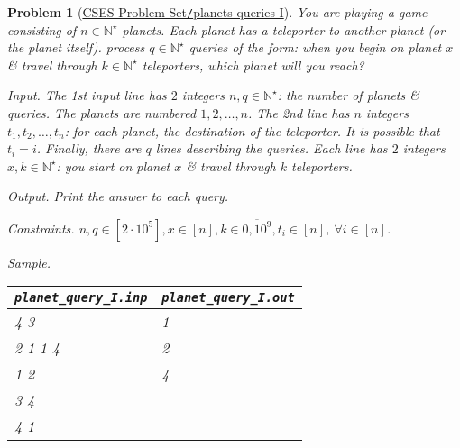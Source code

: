 \documentclass{article}
\newtheorem{problem}{Problem}
\begin{document}
\begin{problem}[\href{https://cses.fi/problemset/task/1750}{CSES Problem Set{\tt/}planets queries I}]
    You are playing a game consisting of $n\in\mathbb{N}^\star$ planets. Each planet has a teleporter to another planet (or the planet itself). process $q\in\mathbb{N}^\star$ queries of the form: when you begin on planet $x$ \& travel through $k\in\mathbb{N}^\star$ teleporters, which planet will you reach?
    \item {\sf Input.} The 1st input line has $2$ integers $n,q\in\mathbb{N}^\star$: the number of planets \& queries. The planets are numbered $1,2,\ldots,n$. The 2nd line has $n$ integers $t_1,t_2,\ldots,t_n$: for each planet,  the destination of the teleporter. It is possible that $t_i = i$. Finally, there are $q$ lines describing the queries. Each line has $2$ integers $x,k\in\mathbb{N}^\star$: you start on planet $x$ \& travel through $k$ teleporters.
    \item {\sf Output.} Print the answer to each query.
    \item {\sf Constraints.} $n,q\in[2\cdot10^5],x\in[n],k\in\overline{0,10^9},t_i\in[n]$, $\forall i\in[n]$.
    \item {\sf Sample.}
    \begin{table}[H]
        \centering
        \begin{tabular}{|l|l|}
            \hline
            \verb|planet_query_I.inp| & \verb|planet_query_I.out| \\
            \hline
            4 3 & 1 \\
            2 1 1 4 & 2 \\
            1 2 & 4 \\
            3 4 & \\
            4 1 & \\
            \hline
        \end{tabular}
    \end{table}
\end{problem}
\end{document}
